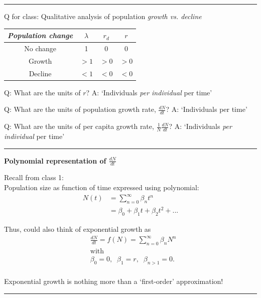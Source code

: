 \documentclass{article}
\newcommand{\note}[1]{\colorbox{gray!20}{#1}}
\begin{document}
\rule[0.5ex]{\linewidth}{1pt}

\break

Q for class: Qualitative analysis of population \emph{growth vs. decline}

\begin{center}
\begin{tabular}{|c|c|c|c|}
\hline \rule[-2ex]{0pt}{5.5ex} \emph{Population change} & $\lambda$ & $r_d$ &  $r$ \\ 
\hline \rule[-2ex]{0pt}{5.5ex} No change & 1 & 0 & 0 \\ 
\hline \rule[-2ex]{0pt}{5.5ex} Growth  & $>1$ & $>0$ & $>0$ \\ 
\hline \rule[-2ex]{0pt}{5.5ex} Decline & $<1$ & $<0$ & $<0$ \\ 
\hline 
\end{tabular}
\end{center} 

\note{Q:}  What are the units of $r$?
\note{A:} `Individuals \emph{per individual} per time'

\note{Q:}  What are the units of population growth rate, $\tfrac{dN}{dt}$?
\note{A:} `Individuals per time'

\note{Q:}  What are the units of per capita growth rate, $\tfrac{1}{N}\tfrac{dN}{dt}$?
\note{A:} `Individuals \emph{per individual} per time'

\rule[0.5ex]{\linewidth}{1pt}

\textbf{Polynomial representation of $\frac{dN}{dt}$}

Recall from class 1:\\
Population size as function of time expressed using polynomial:
\begin{align*}
	N(t)& =\sum_{n=0}^\infty \beta_n t^n\\
	& = \beta_0 + \beta_1 t + \beta_2 t^2 +...
\end{align*}


Thus, could also think of exponential growth as
\begin{align*}
&	\frac{dN}{dt}=f(N)=\sum_{n=0}^\infty \beta_n N^n \\
& 	\text{with }\\
&  \beta_0=0, \;\; \beta_1 = r, \;\; \beta_{n>1}=0.\\
\end{align*}

Exponential growth is nothing more than a `first-order' approximation!

\rule[0.5ex]{\linewidth}{1pt}
\end{document}
